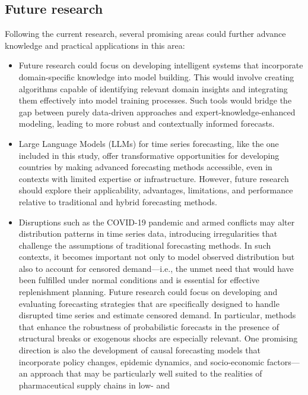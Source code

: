 \documentclass[
  authoryear,
  preprint,
  3p]{elsarticle}
\begin{document}
\subsection{Future research}\label{future-research}

Following the current research, several promising areas could further
advance knowledge and practical applications in this area:

\begin{itemize}
\item
  Future research could focus on developing intelligent systems that
  incorporate domain-specific knowledge into model building. This would
  involve creating algorithms capable of identifying relevant domain
  insights and integrating them effectively into model training
  processes. Such tools would bridge the gap between purely data-driven
  approaches and expert-knowledge-enhanced modeling, leading to more
  robust and contextually informed forecasts.
\item
  Large Language Models (LLMs) for time series forecasting, like the one
  included in this study, offer transformative opportunities for
  developing countries by making advanced forecasting methods
  accessible, even in contexts with limited expertise or infrastructure.
  However, future research should explore their applicability,
  advantages, limitations, and performance relative to traditional and
  hybrid forecasting methods.
\item
  Disruptions such as the COVID-19 pandemic and armed conflicts may
  alter distribution patterns in time series data, introducing
  irregularities that challenge the assumptions of traditional
  forecasting methods. In such contexts, it becomes important not only
  to model observed distribution but also to account for censored
  demand---i.e., the unmet need that would have been fulfilled under
  normal conditions and is essential for effective replenishment
  planning. Future research could focus on developing and evaluating
  forecasting strategies that are specifically designed to handle
  disrupted time series and estimate censored demand. In particular,
  methods that enhance the robustness of probabilistic forecasts in the
  presence of structural breaks or exogenous shocks are especially
  relevant. One promising direction is also the development of causal
  forecasting models that incorporate policy changes, epidemic dynamics,
  and socio-economic factors---an approach that may be particularly well
  suited to the realities of pharmaceutical supply chains in low- and

\end{itemize}
\end{document}
